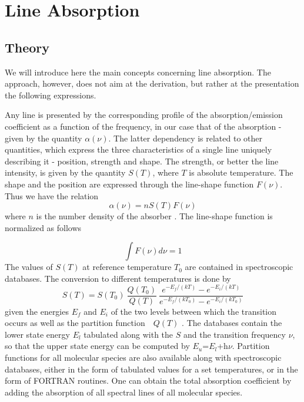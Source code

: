 
\section{Line Absorption}
\label{sec:abs_theory:line_absorption}

\subsection{Theory}
 
We will introduce here the main concepts concerning
line absorption. The approach, however, does not aim  at the
derivation, but rather at the presentation the following expressions.

Any line is presented by the corresponding profile of the
absorption/emission coefficient as a function of the frequency, in our
case that of the absorption - given by the quantity $\alpha(\nu)$. The
latter dependency is related to other quantities, which express the
three characteristics of a single line uniquely describing it -
position, strength and shape.  The strength, or better the line
intensity, is given by the quantity $S(T)$, where $T$ is absolute
temperature. The shape and the position are expressed through the
line-shape function $F(\nu)$. Thus we have the relation
\begin{equation}\label{abs_coeff}
  \alpha(\nu)=nS(T)F(\nu)
\end{equation} 
where $n$ is the number density of the absorber \citep{goodyandyung:89}. The line-shape
function is normalized as follows

\begin{equation}\label{line_shape_norm}
  \int F(\nu)d\nu=1
\end{equation}
The values of $S(T)$ at reference temperature $T_0$ are contained in
spectroscopic databases. The conversion to different temperatures is
done by
\begin{equation}\label{line_intensity}
  S(T)=S(T_0)~\frac{Q(T_0)}{Q(T)}~\frac{e^{-E_f/(kT)}
    - e^{-E_i/(kT)}}{e^{-E_f/(kT_0)} - e^{-E_i/(kT_0)}}
\end{equation}
given the energies $E_f$ and $E_i$ of the two levels between which the
transition occurs as well as the partition function~~$Q(T)$ \citep{rothman:98}. The
databases contain the lower state energy $E_l$ tabulated along with
the $S$ and the transition frequency $\nu$, so that the upper state
energy can be computed by $E_u$=$E_l$+h$\nu$. Partition functions for
all molecular species are also available along with spectroscopic
databases, either in the form of tabulated values for a set
temperatures, or in the form of FORTRAN routines. One can obtain the
total absorption coefficient by adding the absorption of all spectral
lines of all molecular species.

